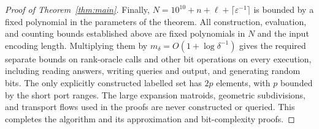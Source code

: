 \begin{proof}[Proof of Theorem~\ref{thm:main}]
Finally, $N=10^{10}+n+\ell+\lceil\varepsilon^{-1}\rceil$ is bounded
by a fixed polynomial in the parameters of the theorem.  All construction,
evaluation, and counting bounds established above are fixed polynomials
in $N$ and the input encoding length.  Multiplying them by
$m_\delta=O(1+\log\delta^{-1})$ gives the required separate bounds on
rank-oracle calls and other bit operations on every execution, including
reading answers, writing queries and output, and generating random bits.
The only explicitly constructed labelled set has $2p$ elements, with
$p$ bounded by the short port ranges.  The large expansion matroids,
geometric subdivisions, and transport flows used in the proofs are
never constructed or queried.  This completes the algorithm and its
approximation and bit-complexity proofs.
\end{proof}
